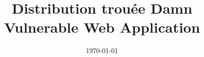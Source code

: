 \documentclass[a4paper,10pt]{article}
\title{Distribution trouée Damn Vulnerable Web Application}
\date{\today}
\begin{document}
\newcommand{\scaledvwa}{0.4} 



\pagebreak

\tableofcontents








\newpage
\appendix



\newpage
\nocite{*}  %


\renewcommand{\refname}{Bibliographie}





\end{document}

